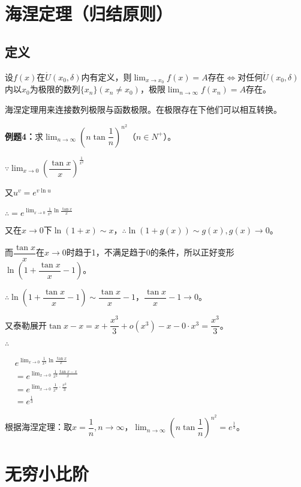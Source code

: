 \documentclass[UTF8]{ctexart}
\begin{document}
\section{海涅定理（归结原则）}

\subsection{定义}

设$f(x)$在$\mathring{U}(x_0,\delta)$内有定义，则$\lim_{x\to x_0}f(x)=A$存在$\Leftrightarrow$对任何$\mathring{U}(x_0,\delta)$内以$x_0$为极限的数列$\{x_n\}(x_n\neq x_0)$，极限$\lim_{n\to\infty}f(x_n)=A$存在。

海涅定理用来连接数列极限与函数极限。在极限存在下他们可以相互转换。

\textbf{例题4：}求$\lim_{n\to\infty}\left(n\tan\dfrac{1}{n}\right)^{n^2}$（$n\in N^+$）。

$\because \lim_{x\to 0}\left(\dfrac{\tan x}{x}\right)^{\frac{1}{x^2}}$

又$u^v=e^{v\ln u}$

$\therefore =e^{\lim_{x\to 0}\frac{1}{x^2}\ln\frac{\tan x}{x}}$

又在$x\to 0$下$\ln (1+x)\sim x$，$\therefore \ln(1+g(x))\sim g(x),g(x)\to 0$。

而$\dfrac{\tan x}{x}$在$x\to 0$时趋于1，不满足趋于0的条件，所以正好变形$\ln\left(1+\dfrac{\tan x}{x}-1\right)$。

$\therefore \ln\left(1+\dfrac{\tan x}{x}-1\right)\sim\dfrac{\tan x}{x}-1$，$\dfrac{\tan x}{x}-1\to 0$。

又泰勒展开$\tan x-x=x+\dfrac{x^3}{3}+o(x^3)-x-0\cdot x^3=\dfrac{x^3}{3}$。

$\therefore$ \bigskip

$
\begin{aligned}
    & e^{\lim_{x\to 0}\frac{1}{x^2}\ln\frac{\tan x}{x}} \\
    & =e^{\lim_{x\to 0}\frac{1}{x^2}\frac{\tan x-x}{x}} \\
    & =e^{\lim_{x\to 0}\frac{1}{x^2}\cdot\frac{x^2}{3}} \\
    & = e^{\frac{1}{3}}
\end{aligned}
$

根据海涅定理：取$x=\dfrac{1}{n},n\to\infty$，$\lim_{n\to\infty}\left(n\tan\dfrac{1}{n}\right)^{n^2}=e^{\frac{1}{3}}$。

\section{无穷小比阶}
\end{document}
